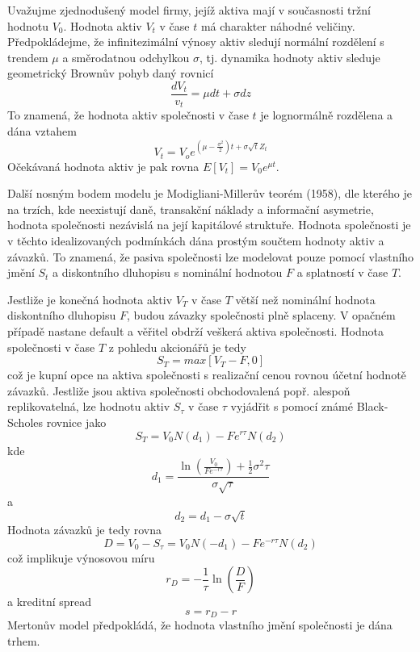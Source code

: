 Uvažujme zjednodušený model firmy, jejíž aktiva mají v současnosti tržní hodnotu $V_0$. Hodnota aktiv $V_t$ v čase $t$ má charakter náhodné veličiny. Předpokládejme, že infinitezimální výnosy aktiv sledují normální rozdělení s trendem $\mu$ a směrodatnou odchylkou $\sigma$, tj. dynamika hodnoty aktiv sleduje geometrický Brownův pohyb daný rovnicí
\begin{equation}
\frac{dV_t}{v_t} = \mu dt + \sigma dz
\end{equation}
To znamená, že hodnota aktiv společnosti v čase $t$ je lognormálně rozdělena a dána vztahem
\begin{equation}
V_t = V_o e^{(\mu - \frac{\sigma^2}{2})t + \sigma \sqrt{t} Z_t}
\end{equation}
Očekávaná hodnota aktiv je pak rovna $E[V_t] = V_0 e^{\mu t}$.

Další nosným bodem modelu je Modigliani-Millerův teorém (1958), dle kterého je na trzích, kde neexistují daně, transakční náklady a informační asymetrie, hodnota společnosti nezávislá na její kapitálové struktuře. Hodnota společnosti je v těchto idealizovaných podmínkách dána prostým součtem hodnoty aktiv a závazků. To znamená, že pasiva společnosti lze modelovat pouze pomocí vlastního jmění $S_t$ a diskontního dluhopisu s nominální hodnotou $F$ a splatností v čase $T$.

Jestliže je konečná hodnota aktiv $V_T$ v čase $T$ větší než nominální hodnota diskontního dluhopisu $F$, budou závazky společnosti plně splaceny. V opačném případě nastane default a věřitel obdrží veškerá aktiva společnosti. Hodnota společnosti v čase $T$ z pohledu akcionářů je tedy
\begin{equation}
S_T = max[V_T - F, 0]
\end{equation}
což je kupní opce na aktiva společnosti s realizační cenou rovnou účetní hodnotě závazků. Jestliže jsou aktiva společnosti obchodovalená popř. alespoň replikovatelná, lze  hodnotu aktiv $S_{\tau}$ v čase $\tau$ vyjádřit s pomocí známé Black-Scholes rovnice jako
\begin{equation}
S_T = V_0N(d_1)-Fe^{r\tau}N(d_2)
\end{equation}
kde
\begin{equation*}
d_1 = \frac{\ln\left(\frac{V_0}{F e^{-r \tau}}\right) + \frac{1}{2}\sigma^2 \tau}{\sigma \sqrt{\tau}}
\end{equation*}
a
\begin{equation*}
d_2 = d_1 - \sigma \sqrt{t}
\end{equation*}
Hodnota závazků je tedy rovna
\begin{equation}
D = V_0 - S_{\tau} = V_0N(-d_1) - Fe^{-r\tau}N(d_2)
\end{equation}
což implikuje výnosovou míru
\begin{equation}
r_D = -\frac{1}{\tau}\ln\left(\frac{D}{F}\right)
\end{equation}
a kreditní spread
\begin{equation}
s = r_D - r
\end{equation}
Mertonův model předpokládá, že hodnota vlastního jmění společnosti je dána trhem.

